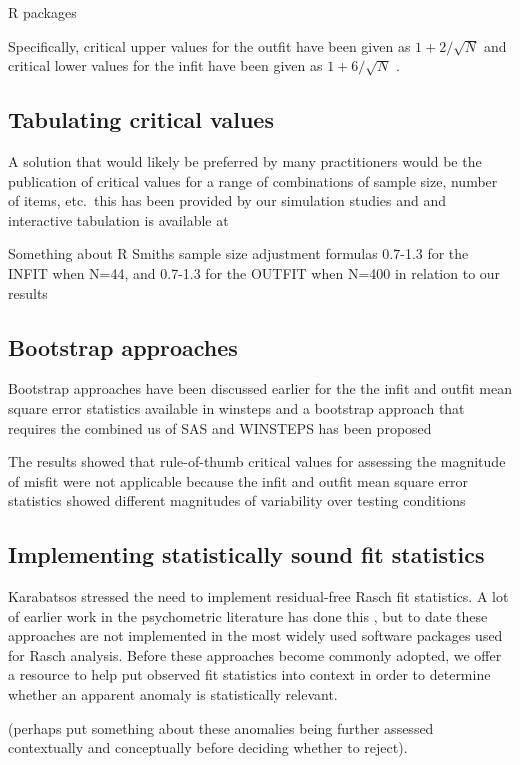 \documentclass{article}
\begin{document}
R packages

Specifically, critical upper values for the outfit have been given as $1+2/\sqrt{N}$ and critical lower values for the infit have been given as $1+6/\sqrt{N}$ \cite{Smith-Schumacker-Bush}.

\subsection{Tabulating critical values}

A solution that would likely be preferred by many practitioners would be the publication of critical values for a range of combinations of sample size, number of items, etc.\ this has been provided by our simulation studies and and interactive tabulation is available at


Something about R Smiths sample size adjustment formulas 0.7-1.3 for the INFIT when N=44, and 0.7-1.3 for the OUTFIT when N=400 in relation to our results

\subsection{Bootstrap approaches}


Bootstrap approaches have been discussed earlier for the the infit and outfit mean square error statistics available in winsteps \cite{Su-Sheu-Wang2007} and a bootstrap approach that requires the combined us of SAS and WINSTEPS has been proposed \cite{Wolfe2008}

The results showed that rule-of-thumb critical values for assessing the magnitude of misfit were not applicable because the infit and outfit mean square error statistics showed different magnitudes of variability over testing conditions


\subsection{Implementing statistically sound fit statistics}

Karabatsos stressed the need to implement residual-free Rasch fit statistics. A lot of earlier work in the psychometric literature has done this \cite{van-den-wollenberg,Glas1988,Christensen-Kreiner2013}, but to date these approaches are not implemented in the most widely used software packages used for Rasch analysis. Before these approaches become commonly adopted, we offer a resource to help put observed fit statistics into context in order to determine whether an apparent anomaly is statistically relevant.

(perhaps put something about these anomalies being further assessed contextually and conceptually before deciding whether to reject).



\clearpage


\end{document}
